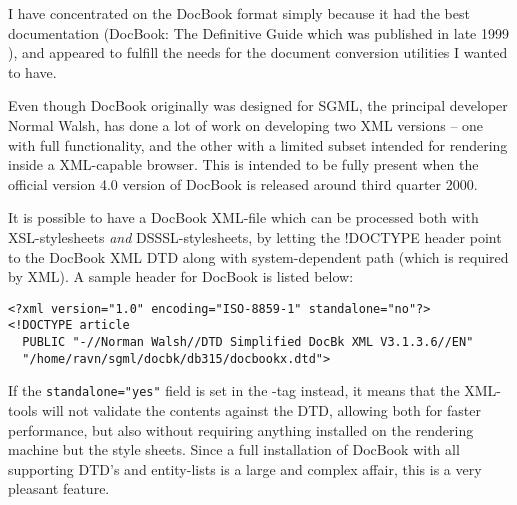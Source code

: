 

I have concentrated on the DocBook format simply because it had the
best documentation (DocBook: The Definitive Guide which was published
in late 1999 \cite{walsh-muellner:docbook-the-definitive-guide}), and
appeared to fulfill the needs for the document conversion utilities I
wanted to have.

Even though DocBook originally was designed for SGML, the principal
developer Normal Walsh, has done a lot of work on developing two XML
versions -- one with full functionality, and the other with a limited
subset intended for rendering inside a XML-capable browser.   This is
intended to be fully present when the official version 4.0 version of
DocBook is released around third quarter 2000.






It is possible to have a DocBook XML-file which can be processed both
with XSL-stylesheets \textit{and} DSSSL-stylesheets, by letting the
!DOCTYPE header point to the DocBook XML DTD along with
system-dependent path (which is required by XML).  A sample header for
DocBook is listed below:

\begin{verbatim}
<?xml version="1.0" encoding="ISO-8859-1" standalone="no"?>
<!DOCTYPE article 
  PUBLIC "-//Norman Walsh//DTD Simplified DocBk XML V3.1.3.6//EN" 
  "/home/ravn/sgml/docbk/db315/docbookx.dtd">
\end{verbatim}

If the \texttt{standalone="yes"} field is set in the -tag
instead, it means that the XML-tools will not validate the contents
against the DTD, allowing both for faster performance, but also
without requiring anything installed on the rendering machine but the
style sheets.  Since a full installation of DocBook with all
supporting DTD's and entity-lists is a large and complex affair, this
is a very pleasant feature.

